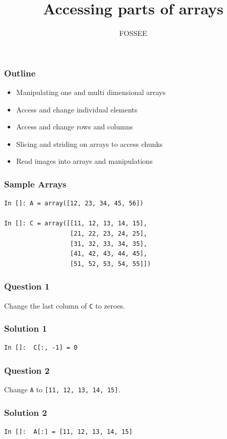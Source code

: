 \documentclass[presentation]{beamer}
\title{Accessing parts of arrays}
\author{FOSSEE}
\date{}
\begin{document}
\maketitle









\begin{frame}
\frametitle{Outline}
\label{sec-1}

\begin{itemize}
\item Manipulating one and multi dimensional arrays
\item Access and change individual elements
\item Access and change rows and columns
\item Slicing and striding on arrays to access chunks
\item Read images into arrays and manipulations
\end{itemize}
\end{frame}
\begin{frame}[fragile]
\frametitle{Sample Arrays}
\label{sec-2}

\begin{verbatim}
In []: A = array([12, 23, 34, 45, 56])

In []: C = array([[11, 12, 13, 14, 15],
                  [21, 22, 23, 24, 25],
                  [31, 32, 33, 34, 35],
                  [41, 42, 43, 44, 45],
                  [51, 52, 53, 54, 55]])
\end{verbatim}
\end{frame}
\begin{frame}
\frametitle{Question 1}
\label{sec-3}

  Change the last column of \texttt{C} to zeroes. 
\end{frame}
\begin{frame}[fragile]
\frametitle{Solution 1}
\label{sec-4}

\begin{verbatim}
In []:  C[:, -1] = 0
\end{verbatim}
\end{frame}
\begin{frame}
\frametitle{Question 2}
\label{sec-5}

  Change \texttt{A} to \texttt{[11, 12, 13, 14, 15]}. 
\end{frame}
\begin{frame}[fragile]
\frametitle{Solution 2}
\label{sec-6}

\begin{verbatim}
In []:  A[:] = [11, 12, 13, 14, 15]
\end{verbatim}
\end{frame}
\end{document}
